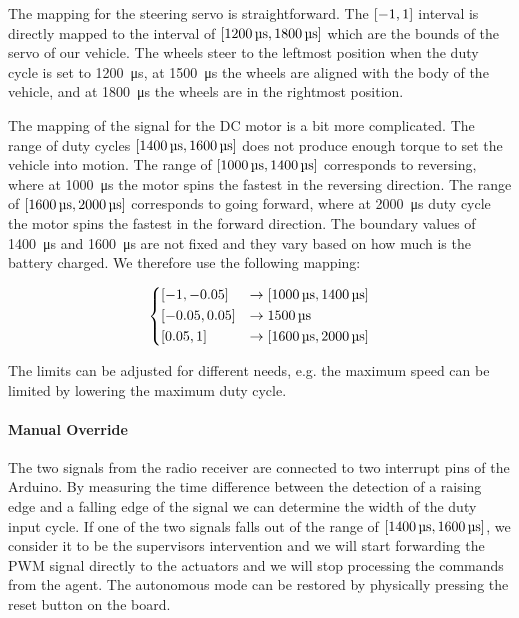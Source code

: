 The mapping for the steering servo is straightforward. The $\interval{-1}{1}$ interval is directly mapped to the interval of $\interval{\SI{1200}{\micro\second}}{\SI{1800}{\micro\second}}$ which are the bounds of the servo of our vehicle. The wheels steer to the leftmost position when the duty cycle is set to \SI{1200}{\micro\second}, at \SI{1500}{\micro\second} the wheels are aligned with the body of the vehicle, and at \SI{1800}{\micro\second} the wheels are in the rightmost position.

The mapping of the signal for the \gls*{DC} motor is a bit more complicated. The range of duty cycles $\interval{\SI{1400}{\micro\second}}{\SI{1600}{\micro\second}}$ does not produce enough torque to set the vehicle into motion. The range of $\interval{\SI{1000}{\micro\second}}{\SI{1400}{\micro\second}}$ corresponds to reversing, where at \SI{1000}{\micro\second} the motor spins the fastest in the reversing direction. The range of $\interval{\SI{1600}{\micro\second}} {\SI{2000}{\micro\second}}$ corresponds to going forward, where at \SI{2000}{\micro\second} duty cycle the motor spins the fastest in the forward direction. The boundary values of \SI{1400}{\micro\second} and \SI{1600}{\micro\second} are not fixed and they vary based on how much is the battery charged. We therefore use the following mapping:

\[
	\begin{dcases}
		\interval{-1}{-0.05} & \rightarrow \interval{\SI{1000}{\micro\second}}{\SI{1400}{\micro\second}} \\
		\interval{-0.05}{0.05} & \rightarrow \SI{1500}{\micro\second} \\
		\interval{0.05}{1} & \rightarrow \interval{\SI{1600}{\micro\second}}{ \SI{2000}{\micro\second}}
	\end{dcases}
\]

The limits can be adjusted for different needs, e.g. the maximum speed can be limited by lowering the maximum duty cycle.

\paragraph{Manual Override}

The two signals from the radio receiver are connected to two interrupt pins of the Arduino. By measuring the time difference between the detection of a raising edge and a falling edge of the signal we can determine the width of the duty input cycle. If one of the two signals falls out of the range of $\interval{\SI{1400}{\micro\second}}{\SI{1600}{\micro\second}}$, we consider it to be the supervisors intervention and we will start forwarding the \gls*{PWM} signal directly to the actuators and we will stop processing the commands from the agent. The autonomous mode can be restored by physically pressing the reset button on the board.

